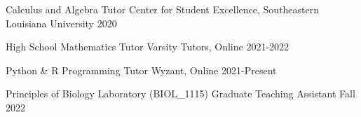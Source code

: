 


\begin{cvhonors}


  \cvhonor
    {Calculus and Algebra Tutor} %
    {Center for Student Excellence, Southeastern Louisiana University} %
    {} %
    {2020} %


  \cvhonor
    {High School Mathematics Tutor} %
    {Varsity Tutors, Online} %
    {} %
    {2021-2022} %
    
  \cvhonor
    {Python \& R Programming Tutor} %
    {Wyzant, Online} %
    {} %
    {2021-Present} %

  \cvhonor
    {Principles of Biology Laboratory (BIOL\_1115)} %
    {Graduate Teaching Assistant} %
    {} %
    {Fall 2022} %

\end{cvhonors}
